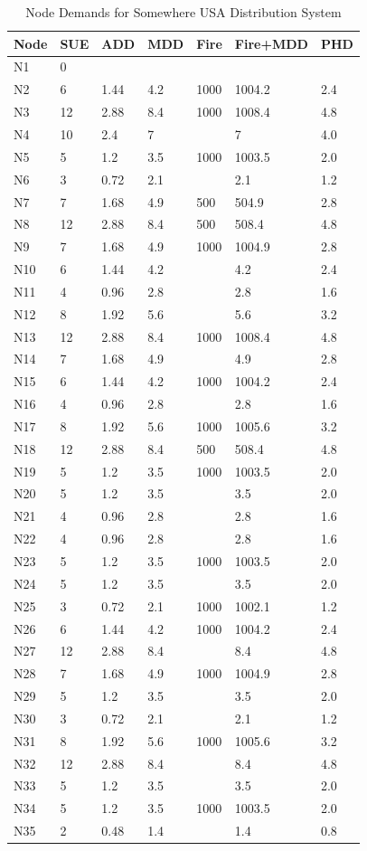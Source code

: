 \documentclass[12pt]{article}
\begin{document}
\begin{enumerate}
\begin{table}[h!]
   \centering
   \caption{Node Demands for Somewhere USA Distribution System}
   \begin{tabular}{p{0.5in}p{0.7in}p{0.7in}p{0.7in}p{0.7in}p{0.8in}p{0.7in}} %
Node & SUE & ADD & MDD & Fire & Fire+MDD & PHD \\
\hline
\hline
N1&0&~&~&~&~&\\
N2&6&1.44&4.2&1000&1004.2&2.4\\
N3&12&2.88&8.4&1000&1008.4&4.8\\
N4&10&2.4&7&&7&4.0\\
N5&5&1.2&3.5&1000&1003.5&2.0\\
N6&3&0.72&2.1&&2.1&1.2\\
N7&7&1.68&4.9&500&504.9&2.8\\
N8&12&2.88&8.4&500&508.4&4.8\\
N9&7&1.68&4.9&1000&1004.9&2.8\\
N10&6&1.44&4.2&&4.2&2.4\\
N11&4&0.96&2.8&&2.8&1.6\\
N12&8&1.92&5.6&&5.6&3.2\\
N13&12&2.88&8.4&1000&1008.4&4.8\\
N14&7&1.68&4.9&&4.9&2.8\\
N15&6&1.44&4.2&1000&1004.2&2.4\\
N16&4&0.96&2.8&&2.8&1.6\\
N17&8&1.92&5.6&1000&1005.6&3.2\\
N18&12&2.88&8.4&500&508.4&4.8\\
N19&5&1.2&3.5&1000&1003.5&2.0\\
N20&5&1.2&3.5&&3.5&2.0\\
N21&4&0.96&2.8&&2.8&1.6\\
N22&4&0.96&2.8&&2.8&1.6\\
N23&5&1.2&3.5&1000&1003.5&2.0\\
N24&5&1.2&3.5&&3.5&2.0\\
N25&3&0.72&2.1&1000&1002.1&1.2\\
N26&6&1.44&4.2&1000&1004.2&2.4\\
N27&12&2.88&8.4&&8.4&4.8\\
N28&7&1.68&4.9&1000&1004.9&2.8\\
N29&5&1.2&3.5&&3.5&2.0\\
N30&3&0.72&2.1&&2.1&1.2\\
N31&8&1.92&5.6&1000&1005.6&3.2\\
N32&12&2.88&8.4&&8.4&4.8\\
N33&5&1.2&3.5&&3.5&2.0\\
N34&5&1.2&3.5&1000&1003.5&2.0\\
N35&2&0.48&1.4&&1.4&0.8\\
   \end{tabular}


\end{table}
\end{enumerate}
\end{document}
